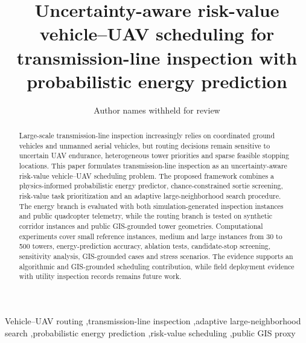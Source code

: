 ﻿\documentclass[preprint,10pt,authoryear]{elsarticle}
\begin{document}
\begin{frontmatter}

\title{Uncertainty-aware risk-value vehicle--UAV scheduling for transmission-line inspection with probabilistic energy prediction}

\author[inst1]{Author names withheld for review}

\begin{abstract}
Large-scale transmission-line inspection increasingly relies on coordinated ground vehicles and unmanned aerial vehicles, but routing decisions remain sensitive to uncertain UAV endurance, heterogeneous tower priorities and sparse feasible stopping locations. This paper formulates transmission-line inspection as an uncertainty-aware risk-value vehicle--UAV scheduling problem. The proposed framework combines a physics-informed probabilistic energy predictor, chance-constrained sortie screening, risk-value task prioritization and an adaptive large-neighborhood search procedure. The energy branch is evaluated with both simulation-generated inspection instances and public quadcopter telemetry, while the routing branch is tested on synthetic corridor instances and public GIS-grounded tower geometries. Computational experiments cover small reference instances, medium and large instances from 30 to 500 towers, energy-prediction accuracy, ablation tests, candidate-stop screening, sensitivity analysis, GIS-grounded cases and stress scenarios. The evidence supports an algorithmic and GIS-grounded scheduling contribution, while field deployment evidence with utility inspection records remains future work.
\end{abstract}

\begin{keyword}
Vehicle--UAV routing \sep transmission-line inspection \sep adaptive large-neighborhood search \sep probabilistic energy prediction \sep risk-value scheduling \sep public GIS proxy
\end{keyword}

\end{frontmatter}




\end{document}
